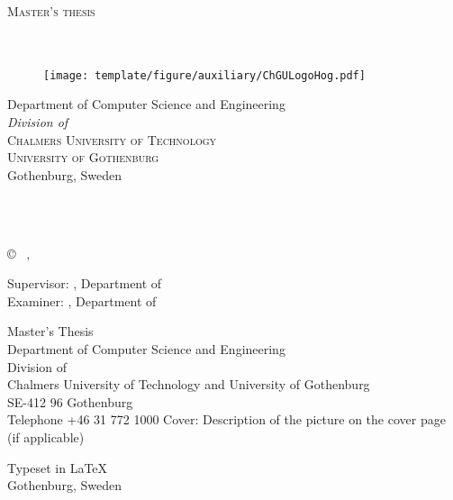 \newpage
\thispagestyle{empty}
\begin{center}
	\textsc{\large Master's thesis \the\year}\\[4cm]		%
	\textbf{\Large \multiLineTitle{0.2cm}} \\[1cm]
	{\large \oneLineSubtitle}\\[1cm]
	{\large \theauthor}

	\vfill
	\begin{figure}[H]
	\centering
	\texttt{[image: template/figure/auxiliary/ChGULogoHog.pdf]}
	\end{figure}	\vspace{5mm}

	Department of Computer Science and Engineering\\
	\emph{Division of \thedivision}\\
	\textsc{Chalmers University of Technology} \\
	\textsc{University of Gothenburg} \\
	Gothenburg, Sweden \the\year \\
\end{center}


\newpage
\thispagestyle{plain}
\vspace*{4.5cm}
\noindent \oneLineTitle\\
\oneLineSubtitle\\
\theauthor

\vspace{1cm}

\copyright ~ \theauthor, \the\year

\vspace{1em}

Supervisor: \thesupervisor, Department of \thedepartmentofsupervisor\\
Examiner: \theexaminer, Department of \thedepartmentofexaminer

\vspace{1em}

Master's Thesis \the\year\\
Department of Computer Science and Engineering\\
Division of \thedivision\\
Chalmers University of Technology and University of Gothenburg\\
SE-412 96 Gothenburg\\
Telephone +46 31 772 1000
\vspace{0.5cm}
\vfill
Cover: Description of the picture on the cover page (if applicable)

Typeset in \LaTeX \\
Gothenburg, Sweden \the\year

\setlength{\parindent}{1.5em}
